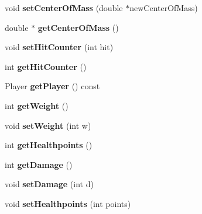 \begin{DoxyCompactItemize}
\item 
void {\bfseries set\+Center\+Of\+Mass} (double $\ast$new\+Center\+Of\+Mass)\hypertarget{class_world_object_a14befa1bd922a8c9f7134352103de942}{}\label{class_world_object_a14befa1bd922a8c9f7134352103de942}

\item 
double $\ast$ {\bfseries get\+Center\+Of\+Mass} ()\hypertarget{class_world_object_adec5084311ea0477db37e9bbeddeb401}{}\label{class_world_object_adec5084311ea0477db37e9bbeddeb401}

\item 
void {\bfseries set\+Hit\+Counter} (int hit)\hypertarget{class_world_object_aae9c6fd3df711b5e0df44ad1e6fcabab}{}\label{class_world_object_aae9c6fd3df711b5e0df44ad1e6fcabab}

\item 
int {\bfseries get\+Hit\+Counter} ()\hypertarget{class_world_object_a22888de0c352adf646e4c87584efe39c}{}\label{class_world_object_a22888de0c352adf646e4c87584efe39c}

\item 
Player {\bfseries get\+Player} () const \hypertarget{class_world_object_ac3ff724096106165c68e3e9600032233}{}\label{class_world_object_ac3ff724096106165c68e3e9600032233}

\item 
int {\bfseries get\+Weight} ()\hypertarget{class_world_object_a8061ac1f99f6ed3f78d42a39cb82d0c2}{}\label{class_world_object_a8061ac1f99f6ed3f78d42a39cb82d0c2}

\item 
void {\bfseries set\+Weight} (int w)\hypertarget{class_world_object_a39b88d87246ad4d526d6b7c54aeb7e82}{}\label{class_world_object_a39b88d87246ad4d526d6b7c54aeb7e82}

\item 
int {\bfseries get\+Healthpoints} ()\hypertarget{class_world_object_ac6f9accf985f4f67f1219ad0196a5096}{}\label{class_world_object_ac6f9accf985f4f67f1219ad0196a5096}

\item 
int {\bfseries get\+Damage} ()\hypertarget{class_world_object_ab391ed4eceba196caf01860868640f95}{}\label{class_world_object_ab391ed4eceba196caf01860868640f95}

\item 
void {\bfseries set\+Damage} (int d)\hypertarget{class_world_object_a62cc2d1b031251c40343d2b453acbd3a}{}\label{class_world_object_a62cc2d1b031251c40343d2b453acbd3a}

\item 
void {\bfseries set\+Healthpoints} (int points)\hypertarget{class_world_object_a2ad8e7e458a573830f1609f4d9d3eacf}{}\label{class_world_object_a2ad8e7e458a573830f1609f4d9d3eacf}


\end{DoxyCompactItemize}
